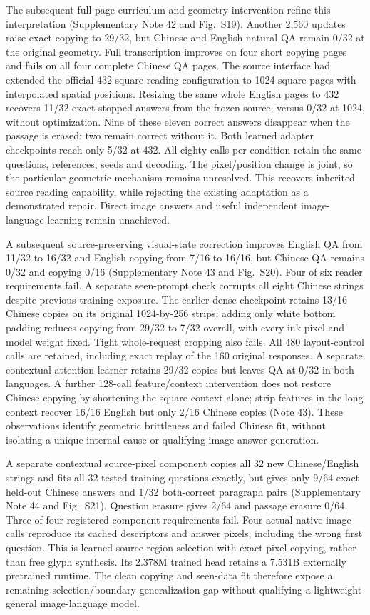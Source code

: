 \documentclass[12pt,a4paper]{article}
\begin{document}
The subsequent full-page curriculum and geometry intervention refine this
interpretation (Supplementary Note 42 and Fig.~S19). Another 2,560 updates
raise exact copying to 29/32, but Chinese and English natural QA remain 0/32
at the original geometry. Full transcription improves on four short copying
pages and fails on all four complete Chinese QA pages. The source interface
had extended the official 432-square reading configuration to 1024-square
pages with interpolated spatial positions. Resizing the same whole English
pages to 432 recovers 11/32 exact stopped answers from the frozen source,
versus 0/32 at 1024, without optimization. Nine of these eleven correct
answers disappear when the passage is erased; two remain correct without it.
Both learned adapter checkpoints reach only 5/32 at 432. All eighty calls per
condition retain the same questions, references, seeds and decoding. The
pixel/position change is joint, so the particular geometric mechanism remains
unresolved. This recovers inherited source reading capability, while rejecting
the existing adaptation as a demonstrated repair. Direct image answers and
useful independent image-language learning remain unachieved.

A subsequent source-preserving visual-state correction improves English QA from 11/32 to 16/32 and English copying from 7/16 to 16/16, but Chinese QA remains 0/32 and copying 0/16 (Supplementary Note 43 and Fig.~S20). Four of six reader requirements fail. A separate seen-prompt check corrupts all eight Chinese strings despite previous training exposure. The earlier dense checkpoint retains 13/16 Chinese copies on its original 1024-by-256 strips; adding only white bottom padding reduces copying from 29/32 to 7/32 overall, with every ink pixel and model weight fixed. Tight whole-request cropping also fails. All 480 layout-control calls are retained, including exact replay of the 160 original responses. A separate contextual-attention learner retains 29/32 copies but leaves QA at 0/32 in both languages. A further 128-call feature/context intervention does not restore Chinese copying by shortening the square context alone; strip features in the long context recover 16/16 English but only 2/16 Chinese copies (Note 43). These observations identify geometric brittleness and failed Chinese fit, without isolating a unique internal cause or qualifying image-answer generation.

A separate contextual source-pixel component copies all 32 new Chinese/English
strings and fits all 32 tested training questions exactly, but gives only
9/64 exact held-out Chinese answers and 1/32 both-correct paragraph pairs
(Supplementary Note 44 and Fig.~S21). Question erasure gives 2/64 and passage
erasure 0/64. Three of four registered component requirements fail. Four
actual native-image calls reproduce its cached descriptors and answer pixels,
including the wrong first question. This is learned source-region selection
with exact pixel copying, rather than free glyph synthesis. Its 2.378M trained
head retains a 7.531B externally pretrained runtime. The clean copying and
seen-data fit therefore expose a remaining selection/boundary generalization
gap without qualifying a lightweight general image-language model.
\end{document}
